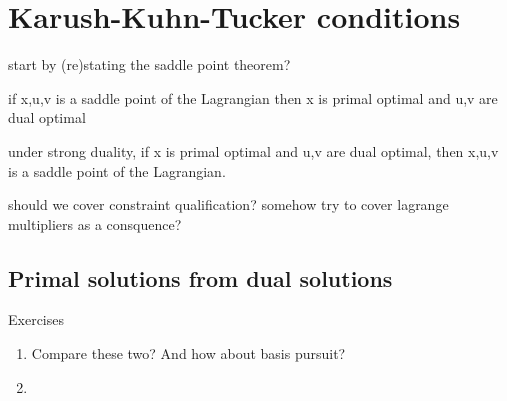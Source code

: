 \chapter{Karush-Kuhn-Tucker conditions}
\label{chap:kkt_conditions}

start by (re)stating the saddle point theorem?

if x,u,v is a saddle point of the Lagrangian then x is primal optimal and u,v
are dual optimal

under strong duality, if x is primal optimal and u,v are dual optimal, then
x,u,v is a saddle point of the Lagrangian.

should we cover constraint qualification? 
somehow try to cover lagrange multipliers as a consquence?

\section{Primal solutions from dual solutions}


\begin{xcb}{Exercises}
\begin{enumerate}[label=\thechapter.\arabic*]
\settowidth{\leftmargini}{00.00.\hskip\labelsep}
\item \label{ex:lasso_dantzig}
Compare these two? And how about basis pursuit?

\item \label{ex:simplex_projection}

\end{enumerate}
\end{xcb}